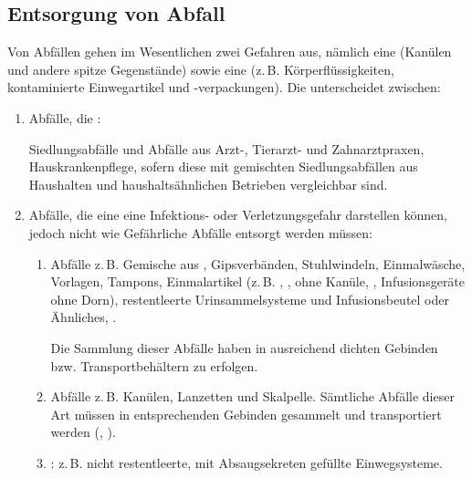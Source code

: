 \cite{Loew200611}





\subsection{Entsorgung von Abfall}
\label{topic:entsorgung-infektioeser-abfall}
\label{topic:abfall-infektioeser-entsorgung}

Von Abfällen gehen im Wesentlichen zwei Gefahren aus,
nämlich eine  (Kanülen und andere
spitze Gegenstände) sowie eine 
(z.\,B. Körperflüssigkeiten, kontaminierte Einwegartikel
und -verpackungen). 
Die  \cite{OenormS2104-2005}
unterscheidet zwischen:
\begin{enumerate}
  \item Abfälle, die :
  \label{item:hyg-abfall-oenorm-gruppe1}
  
  Siedlungsabfälle und Abfälle aus Arzt-, Tierarzt- und
  Zahnarztpraxen, Hauskrankenpflege, sofern diese mit gemischten
  Siedlungsabfällen aus Haushalten und haushaltsähnlichen
  Betrieben vergleichbar sind.

  \item Abfälle, die  eine eine Infektions- oder Verletzungsgefahr
  darstellen können, jedoch nicht wie Gefährliche Abfälle
  entsorgt werden müssen:
  \label{item:hyg-abfall-oenorm-gruppe2}
  \begin{enumerate}
    \item Abfälle  z.\,B.
    Gemische aus , Gipsverbänden,
    Stuhlwindeln, Einmalwäsche, Vorlagen, Tampons,
    Einmalartikel (z.\,B. , ,
     ohne Kanüle, ,
    Infusionsgeräte ohne Dorn), restentleerte
    Urinsammelsysteme und Infusionsbeutel oder Ähnliches,
    .
    
    Die Sammlung dieser Abfälle haben in
    ausreichend dichten Gebinden bzw. Transportbehältern zu
    erfolgen.
    \item Abfälle 
    z.\,B. Kanülen, Lanzetten und
    Skalpelle. Sämtliche Abfälle dieser Art müssen in
    entsprechenden Gebinden gesammelt und transportiert
    werden (,
    ).
    \item {}:
    z.\,B. nicht restentleerte, mit Absaugsekreten gefüllte
    Einwegsysteme.
    

\end{enumerate}
\end{enumerate}
